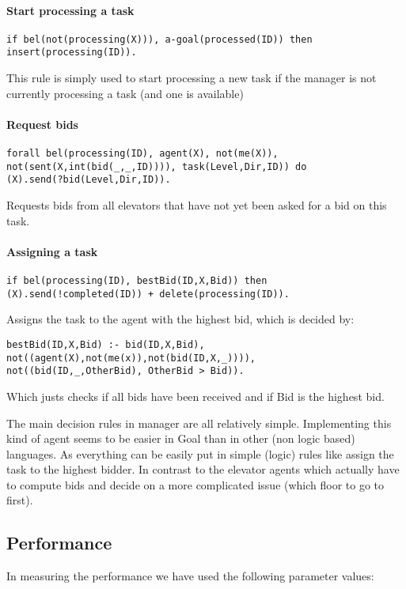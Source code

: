 \documentclass[a4paper,11pt]{article}
\begin{document}
\paragraph*{Start processing a task}
\begin{verbatim}
if bel(not(processing(X))), a-goal(processed(ID)) then
insert(processing(ID)).
\end{verbatim}
This rule is simply used to start processing a new task if the manager is not currently processing a task (and one is available)

\paragraph*{Request bids}
\begin{verbatim}
forall bel(processing(ID), agent(X), not(me(X)), 
not(sent(X,int(bid(_,_,ID)))), task(Level,Dir,ID)) do
(X).send(?bid(Level,Dir,ID)).
\end{verbatim}
Requests bids from all elevators that have not yet been asked for a bid on this task.

\paragraph*{Assigning a task}
\begin{verbatim}
if bel(processing(ID), bestBid(ID,X,Bid)) then
(X).send(!completed(ID)) + delete(processing(ID)).
\end{verbatim}
Assigns the task to the agent with the highest bid, which is decided by:

\begin{verbatim}
bestBid(ID,X,Bid) :- bid(ID,X,Bid), not((agent(X),not(me(x)),not(bid(ID,X,_)))), 
not((bid(ID,_,OtherBid), OtherBid > Bid)).
\end{verbatim}
Which justs checks if all bids have been received and if Bid is the highest bid.

The main decision rules in manager are all relatively simple. Implementing this kind of agent seems to be easier in Goal than in other (non logic based) languages. As everything can be easily put in simple (logic) rules like assign the task to the highest bidder. In contrast to the elevator agents which actually have to compute bids and decide on a more complicated issue (which floor to go to first). 

\subsection{Performance}
In measuring the performance we have used the following parameter values:
\end{document}
